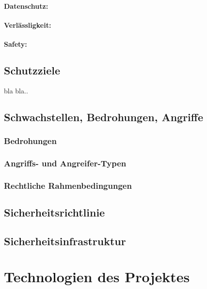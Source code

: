 \paragraph{Datenschutz:}

\paragraph{Verlässligkeit:}

\paragraph{Safety:}


\subsection{Schutzziele}

bla bla..

\subsection{Schwachstellen, Bedrohungen, Angriffe}

\subsubsection{Bedrohungen}

\subsubsection{Angriffs- und Angreifer-Typen}

\subsubsection{Rechtliche Rahmenbedingungen}

\subsection{Sicherheitsrichtlinie}

\subsection{Sicherheitsinfrastruktur}

\section{Technologien des Projektes}

